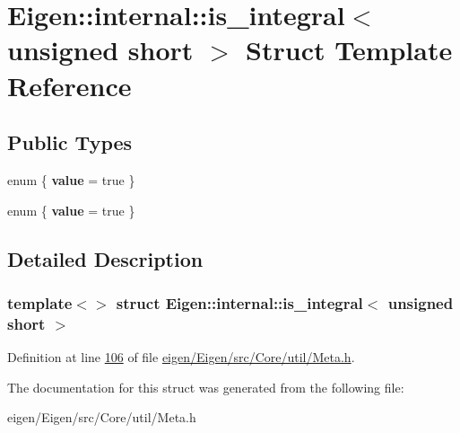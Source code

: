 \hypertarget{struct_eigen_1_1internal_1_1is__integral_3_01unsigned_01short_01_4}{}\section{Eigen\+:\+:internal\+:\+:is\+\_\+integral$<$ unsigned short $>$ Struct Template Reference}
\label{struct_eigen_1_1internal_1_1is__integral_3_01unsigned_01short_01_4}
\subsection*{Public Types}
\begin{DoxyCompactItemize}
\item 
\mbox{\label{struct_eigen_1_1internal_1_1is__integral_3_01unsigned_01short_01_4_ae10df7b201e2b56f77eaf3df4db420d7}} 
enum \{ {\bfseries value} = true
 \}
\item 
\mbox{\label{struct_eigen_1_1internal_1_1is__integral_3_01unsigned_01short_01_4_a86cbcdc75939501006231c8666ff08eb}} 
enum \{ {\bfseries value} = true
 \}
\end{DoxyCompactItemize}


\subsection{Detailed Description}
\subsubsection*{template$<$$>$\newline
struct Eigen\+::internal\+::is\+\_\+integral$<$ unsigned short $>$}



Definition at line \hyperlink{eigen_2_eigen_2src_2_core_2util_2_meta_8h_source_l00106}{106} of file \hyperlink{eigen_2_eigen_2src_2_core_2util_2_meta_8h_source}{eigen/\+Eigen/src/\+Core/util/\+Meta.\+h}.



The documentation for this struct was generated from the following file\+:\begin{DoxyCompactItemize}
\item 
eigen/\+Eigen/src/\+Core/util/\+Meta.\+h\end{DoxyCompactItemize}

